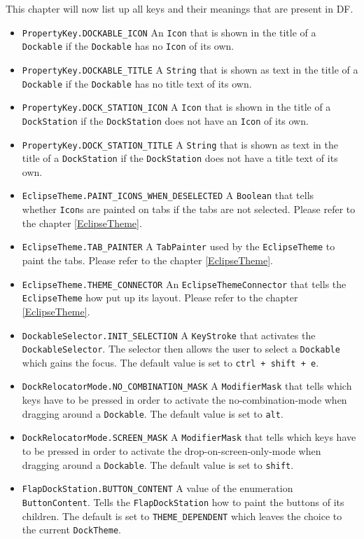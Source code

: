 \documentclass[a4paper,10pt]{article}
\newcommand{\src}[1]{\lstinline[basicstyle=\normalsize\ttfamily,keywordstyle=\normalsize\ttfamily,identifierstyle=\normalsize\ttfamily]|#1|}
\begin{document}
This chapter will now list up all keys and their meanings that are present in DF. 

\begin{itemize}
\item \src{PropertyKey.DOCKABLE_ICON} An \src{Icon} that is shown in the title of a \src{Dockable} if the \src{Dockable} has no \src{Icon} of its own.
\item \src{PropertyKey.DOCKABLE_TITLE} A \src{String} that is shown as text in the title of a \src{Dockable} if the \src{Dockable} has no title text of its own.
\item \src{PropertyKey.DOCK_STATION_ICON} A \src{Icon} that is shown in the title of a \src{DockStation} if the \src{DockStation} does not have an \src{Icon} of its own.
\item \src{PropertyKey.DOCK_STATION_TITLE} A \src{String} that is shown as text in the title of a \src{DockStation} if the \src{DockStation} does not have a title text of its own.
\item \src{EclipseTheme.PAINT_ICONS_WHEN_DESELECTED} A \src{Boolean} that tells \\whether \src{Icon}s are painted on tabs if the tabs are not selected. Please refer to the chapter \ref{EclipseTheme}.
\item \src{EclipseTheme.TAB_PAINTER} A \src{TabPainter} used by the \src{EclipseTheme} to paint the tabs. Please refer to the chapter \ref{EclipseTheme}.
\item \src{EclipseTheme.THEME_CONNECTOR} An \src{EclipseThemeConnector} that tells the \src{EclipseTheme} how put up its layout. Please refer to the chapter \ref{EclipseTheme}.
\item \src{DockableSelector.INIT_SELECTION} A \src{KeyStroke} that activates the \\\src{DockableSelector}. The selector then allows the user to select a \src{Dockable} which gains the focus. The default value is set to \src{ctrl + shift + e}.
\item \src{DockRelocatorMode.NO_COMBINATION_MASK} A \src{ModifierMask} that tells which keys have to be pressed in order to activate the no-combination-mode when dragging around a \src{Dockable}. The default value is set to \src{alt}.
\item \src{DockRelocatorMode.SCREEN_MASK} A \src{ModifierMask} that tells which keys have to be pressed in order to activate the drop-on-screen-only-mode when dragging around a \src{Dockable}. The default value is set to \src{shift}.
\item \src{FlapDockStation.BUTTON_CONTENT} A value of the enumeration \\\src{ButtonContent}. Tells the \src{FlapDockStation} how to paint the buttons of its children. The default is set to \src{THEME_DEPENDENT} which leaves the choice to the current \src{DockTheme}.

\end{itemize}
\end{document}
